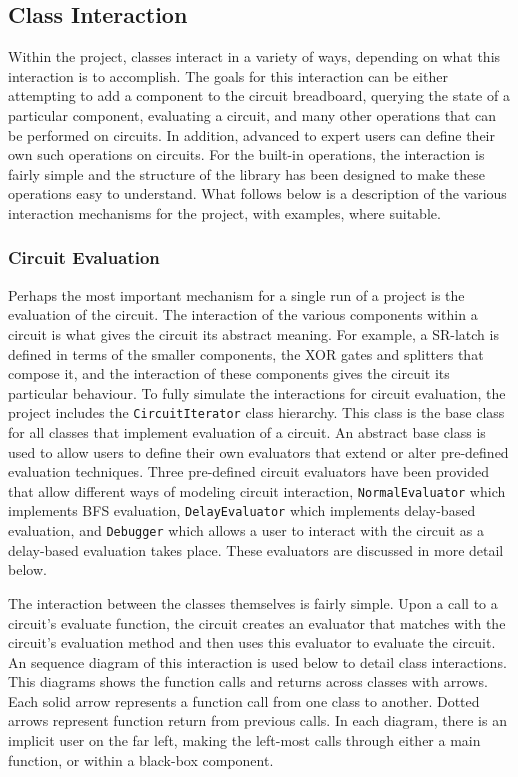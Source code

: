 \documentclass{article}
\newcommand{\ClassName}[1]{\texttt{#1}}
\begin{document}
\subsection{Class Interaction}

Within the project, classes interact in a variety of ways, depending on what this interaction is to accomplish. The goals for this interaction can be either attempting to add a component to the circuit breadboard, querying the state of a particular component, evaluating a circuit, and many other operations that can be performed on circuits. In addition, advanced to expert users can define their own such operations on circuits. For the built-in operations, the interaction is fairly simple and the structure of the library has been designed to make these operations easy to understand. What follows below is a description of the various interaction mechanisms for the project, with examples, where suitable.

\subsubsection{Circuit Evaluation}

Perhaps the most important mechanism for a single run of a project is the evaluation of the circuit. The interaction of the various components within a circuit is what gives the circuit its abstract meaning. For example, a SR-latch is defined in terms of the smaller components, the XOR gates and splitters that compose it, and the interaction of these components gives the circuit its particular behaviour. To fully simulate the interactions for circuit evaluation, the project includes the \ClassName{CircuitIterator} class hierarchy. This class is the base class for all classes that implement evaluation of a circuit.  An abstract base class is used to allow users to define their own evaluators that extend or alter pre-defined evaluation techniques. Three pre-defined circuit evaluators have been provided that allow different ways of modeling circuit interaction, \ClassName{NormalEvaluator} which implements BFS evaluation, \ClassName{DelayEvaluator} which implements delay-based evaluation, and \ClassName{Debugger}
 which allows a user to interact with the circuit as a delay-based evaluation takes place. These evaluators are discussed in more detail below.

The interaction between the classes themselves is fairly simple. Upon a call to a circuit’s evaluate function, the circuit creates an evaluator that matches with the circuit’s evaluation method and then uses this evaluator to evaluate the circuit. An sequence diagram of this interaction is used below to detail class interactions. This diagrams shows the function calls and returns across classes with arrows. Each solid arrow represents a function call from one class to another. Dotted arrows represent function return from previous calls. In each diagram, there is an implicit user on the far left, making the left-most calls through either a main function, or within a black-box component.
\end{document}
